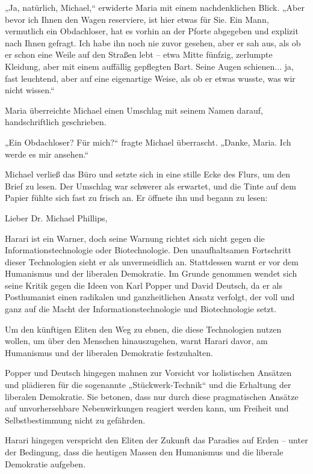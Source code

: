 \documentclass[
]{article}
\begin{document}
„Ja, natürlich, Michael,`` erwiderte Maria mit einem nachdenklichen
Blick. „Aber bevor ich Ihnen den Wagen reserviere, ist hier etwas für
Sie. Ein Mann, vermutlich ein Obdachloser, hat es vorhin an der Pforte
abgegeben und explizit nach Ihnen gefragt. Ich habe ihn noch nie zuvor
gesehen, aber er sah aus, als ob er schon eine Weile auf den Straßen
lebt -- etwa Mitte fünfzig, zerlumpte Kleidung, aber mit einem auffällig
gepflegten Bart. Seine Augen schienen... ja, fast leuchtend, aber auf
eine eigenartige Weise, als ob er etwas wusste, was wir nicht wissen.``

Maria überreichte Michael einen Umschlag mit seinem Namen darauf,
handschriftlich geschrieben.

„Ein Obdachloser? Für mich?{\kern0pt}`` fragte Michael überrascht.
„Danke, Maria. Ich werde es mir ansehen.``

Michael verließ das Büro und setzte sich in eine stille Ecke des Flurs,
um den Brief zu lesen. Der Umschlag war schwerer als erwartet, und die
Tinte auf dem Papier fühlte sich fast zu frisch an. Er öffnete ihn und
begann zu lesen:

Lieber Dr. Michael Phillips,

Harari ist ein Warner, doch seine Warnung richtet sich nicht gegen die
Informationstechnologie oder Biotechnologie. Den unaufhaltsamen
Fortschritt dieser Technologien sieht er als unvermeidlich an.
Stattdessen warnt er vor dem Humanismus und der liberalen Demokratie. Im
Grunde genommen wendet sich seine Kritik gegen die Ideen von Karl Popper
und David Deutsch, da er als Posthumanist einen radikalen und
ganzheitlichen Ansatz verfolgt, der voll und ganz auf die Macht der
Informationstechnologie und Biotechnologie setzt.

Um den künftigen Eliten den Weg zu ebnen, die diese Technologien nutzen
wollen, um über den Menschen hinauszugehen, warnt Harari davor, am
Humanismus und der liberalen Demokratie festzuhalten.

Popper und Deutsch hingegen mahnen zur Vorsicht vor holistischen
Ansätzen und plädieren für die sogenannte „Stückwerk-Technik`` und die
Erhaltung der liberalen Demokratie. Sie betonen, dass nur durch diese
pragmatischen Ansätze auf unvorhersehbare Nebenwirkungen reagiert werden
kann, um Freiheit und Selbstbestimmung nicht zu gefährden.

Harari hingegen verspricht den Eliten der Zukunft das Paradies auf Erden
-- unter der Bedingung, dass die heutigen Massen den Humanismus und die
liberale Demokratie aufgeben.
\end{document}
